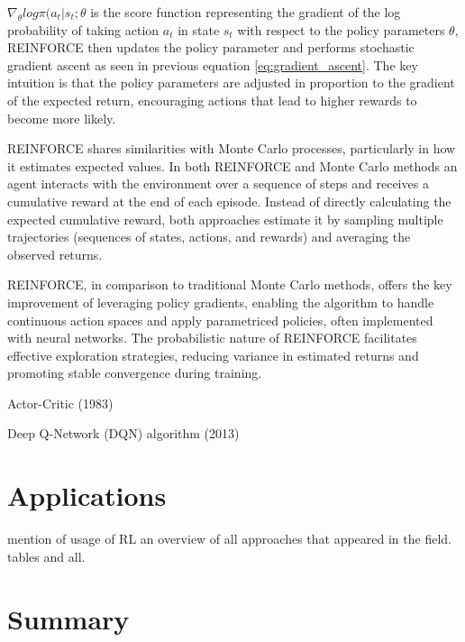 $\nabla_\theta log \pi(a_t|s_t;\theta$ is the score function representing the gradient of the log probability of taking action $a_t$ in state $s_t$ with respect to the policy parameters $\theta$, REINFORCE then updates the policy parameter and performs stochastic gradient ascent as seen in previous equation \ref{eq:gradient_ascent}. The key intuition is that the policy parameters are adjusted in proportion to the gradient of the expected return, encouraging actions that lead to higher rewards to become more likely.

REINFORCE shares similarities with Monte Carlo processes, particularly in how it estimates expected values. In both REINFORCE and Monte Carlo methods an agent interacts with the environment over a sequence of steps and receives a cumulative reward at the end of each episode. Instead of directly calculating the expected cumulative reward, both approaches estimate it by sampling multiple trajectories (sequences of states, actions, and rewards) and averaging the observed returns.

REINFORCE, in comparison to traditional Monte Carlo methods, offers the key improvement of leveraging policy gradients, enabling the algorithm to handle continuous action spaces and apply parametriced policies, often implemented with neural networks. The probabilistic nature of REINFORCE facilitates effective exploration strategies, reducing variance in estimated returns and promoting stable convergence during training.

Actor-Critic (1983)


Deep Q-Network (DQN) algorithm (2013)



\section{Applications}\label{sec:rl-applications}
mention of usage of RL an overview of all approaches that appeared in the field. tables and all.


\section{Summary}\label{sec:path-summary}
